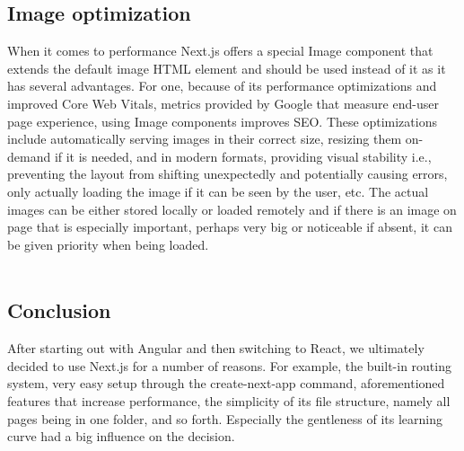 \subsection{Image optimization}
When it comes to performance Next.js offers a special Image component that extends the default image HTML element and should be used instead of
it as it has several advantages. For one, because of its performance optimizations and improved Core Web Vitals, metrics provided by Google that
measure end-user page experience, using Image components improves SEO. These optimizations include automatically serving images in their correct
size, resizing them on-demand if it is needed, and in modern formats, providing visual stability i.e., preventing the layout from shifting unexpectedly
and potentially causing errors, only actually loading the image if it can be seen by the user, etc. The actual images can be either stored locally
or loaded remotely and if there is an image on page that is especially important, perhaps very big or noticeable if absent, it can be given priority
when being loaded. \cite{NextjsImageOptimization}
\\
\\
\subsection{Conclusion}
After starting out with Angular and then switching to React, we ultimately decided to use Next.js for a number of reasons. For example, the built-in
routing system, very easy setup through the create-next-app command, aforementioned features that increase performance, the simplicity of its
file structure, namely all pages being in one folder, and so forth. Especially the gentleness of its learning curve had a big influence on the decision.
\\
\\
